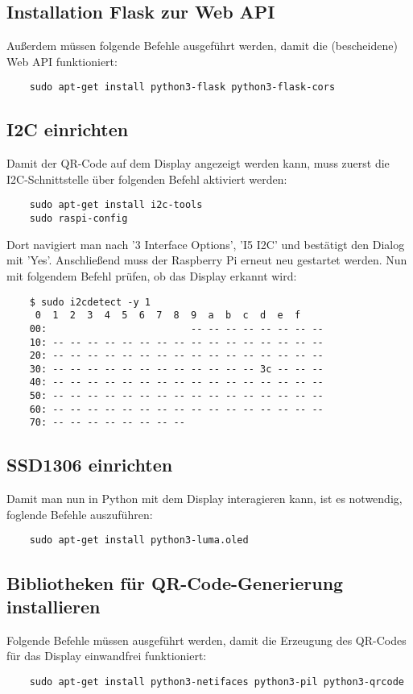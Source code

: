 \documentclass{article}
\begin{document}
\subsection{Installation Flask zur Web API}
Außerdem müssen folgende Befehle ausgeführt werden, damit die (bescheidene) Web API funktioniert:
\begin{verbatim}
    sudo apt-get install python3-flask python3-flask-cors
\end{verbatim}
\subsection{I2C einrichten}
Damit der QR-Code auf dem Display angezeigt werden kann, muss zuerst die I2C-Schnittstelle über folgenden Befehl aktiviert werden:
\begin{verbatim}
    sudo apt-get install i2c-tools
    sudo raspi-config
\end{verbatim}
Dort navigiert man nach '3 Interface Options', 'I5 I2C' und bestätigt den Dialog mit 'Yes'. Anschließend muss der Raspberry Pi erneut neu gestartet werden.
Nun mit folgendem Befehl prüfen, ob das Display erkannt wird:
\begin{verbatim}
    $ sudo i2cdetect -y 1
     0  1  2  3  4  5  6  7  8  9  a  b  c  d  e  f
    00:                         -- -- -- -- -- -- -- -- 
    10: -- -- -- -- -- -- -- -- -- -- -- -- -- -- -- -- 
    20: -- -- -- -- -- -- -- -- -- -- -- -- -- -- -- -- 
    30: -- -- -- -- -- -- -- -- -- -- -- -- 3c -- -- -- 
    40: -- -- -- -- -- -- -- -- -- -- -- -- -- -- -- -- 
    50: -- -- -- -- -- -- -- -- -- -- -- -- -- -- -- -- 
    60: -- -- -- -- -- -- -- -- -- -- -- -- -- -- -- -- 
    70: -- -- -- -- -- -- -- --
\end{verbatim}
\subsection{SSD1306 einrichten}
Damit man nun in Python mit dem Display interagieren kann, ist es notwendig, foglende Befehle auszuführen:
\begin{verbatim}
    sudo apt-get install python3-luma.oled
\end{verbatim}
\subsection{Bibliotheken für QR-Code-Generierung installieren}
Folgende Befehle müssen ausgeführt werden, damit die Erzeugung des QR-Codes für das Display einwandfrei funktioniert:
\begin{verbatim}
    sudo apt-get install python3-netifaces python3-pil python3-qrcode
\end{verbatim}
\end{document}
